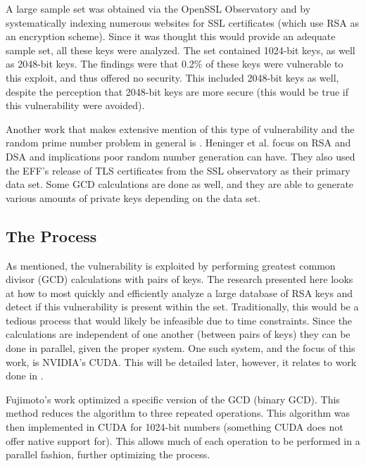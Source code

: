 \documentclass[smallextended]{svjour3}       %
\begin{document}
A large sample set was obtained via the OpenSSL Observatory and by
systematically indexing numerous websites for SSL certificates (which use RSA
as an encryption scheme). Since it was thought this would provide an adequate
sample set, all these keys were analyzed. The set contained 1024-bit keys, as
well as 2048-bit keys. The findings were that 0.2\% of these keys were
vulnerable to this exploit, and thus offered no security. This included
2048-bit keys as well, despite the perception that 2048-bit keys are more
secure (this would be true if this vulnerability were avoided).

Another work that makes extensive mention of this type of vulnerability and the
random prime number problem in general is \cite{heninger2012mining}. Heninger
et al. focus on RSA and DSA and implications poor random number generation can
have. They also used the EFF's release of TLS certificates from the SSL
observatory as their primary data set. Some GCD calculations are done as well,
and they are able to generate various amounts of private keys depending on the
data set.

\subsection{The Process}
\label{subsec:process}
As mentioned, the vulnerability is exploited by performing greatest common
divisor (GCD) calculations with pairs of keys. The research presented here
looks at how to most quickly and efficiently analyze a large database of
RSA keys and detect if this vulnerability is present within the set.
Traditionally, this would be a tedious process that would likely be infeasible
due to time constraints. Since the calculations are independent of one another
(between pairs of keys) they can be done in parallel, given the proper system.
One such system, and the focus of this work, is NVIDIA's CUDA. This will be
detailed later, however, it relates to work done in \cite{fujimoto2009high}. 

Fujimoto's work optimized a specific version of the GCD (binary GCD). This
method reduces the algorithm to three repeated operations. This algorithm was
then implemented in CUDA for 1024-bit numbers (something CUDA does not offer
native support for). This allows much of each operation to be performed in a
parallel fashion, further optimizing the process.
\end{document}
